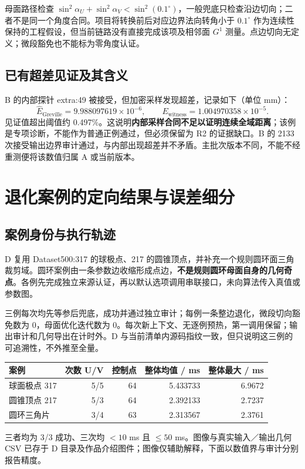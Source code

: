 \documentclass[UTF8,zihao=5,fontset=windows,a4paper]{ctexart}
\begin{document}
母面路径检查 $\sin^2\alpha_U+\sin^2\alpha_V<\sin^2(0.1^\circ)$，一般兜底只检查沿边切向；二者不是同一个角度合同。项目将转换前后对应边界法向转角小于 $0.1^\circ$ 作为连续性保持的工程假设，但当前链路没有直接完成该项及相邻面 $G^1$ 测量。点边切向无定义；微段豁免也不能标为零角度认证。

\subsection{已有超差见证及其含义}
B 的内部探针 extra:49 被接受，但加密采样发现超差，记录如下（单位 mm）：
\[
\widehat E_{\mathrm{Greville}}=9.988097619\times10^{-6},\qquad
E_{\mathrm{witness}}=1.004970358\times10^{-5}.
\]
见证值超出阈值约 0.497\%。这说明\textbf{内部采样合同不足以证明连续全域距离}；该例是专项诊断，不能作为普通正例通过，但必须保留为 R2 的证据缺口。B 的 2133 次接受输出边界审计通过，与内部出现超差并不矛盾。主批次版本不同，不能不经重测便将该数值归属 A 或当前版本。

\newpage
\section{退化案例的定向结果与误差细分}
\subsection{案例身份与执行轨迹}
D 复用 Dataset500:317 的球极点、217 的圆锥顶点，并补充一个规则圆环面三角裁剪域。圆环案例由一条参数边收缩形成点边，\textbf{不是规则圆环母面自身的几何奇点}。各例先完成独立来源认证，再以默认选项调用串联接口，未向算法传入真值或参数图。

三例每次均先等参后兜底，成功并通过独立审计；每例一条整边退化，微段切向豁免数为 0，母面优化迭代数为 0。每次新上下文、无逐例预热，第一调用保留；输出审计和几何导出在计时外。D 与当前清单内源码指纹一致，但只说明这三例的可追溯性，不外推至全量。

\begin{center}\small\renewcommand{\arraystretch}{1.2}
\begin{tabularx}{\linewidth}{@{}Yrrrr@{}}\toprule
案例 & 次数 U/V & 控制点 & 整体均值 / ms & 整体最大 / ms\\\midrule
球面极点 317 & 5/5 & 64 & 5.433733 & 6.9672\\
圆锥顶点 217 & 5/3 & 64 & 2.392133 & 2.7237\\
圆环三角片 & 3/4 & 63 & 2.313567 & 2.3761\\\bottomrule
\end{tabularx}
\end{center}
三者均为 3/3 成功、三次均 $<10$ ms 且 $\le50$ ms。图像与真实输入／输出几何 CSV 已存于 D 目录及作品介绍图件；图像仅辅助解释，下面以数值界与审计分别报告精度。
\end{document}
